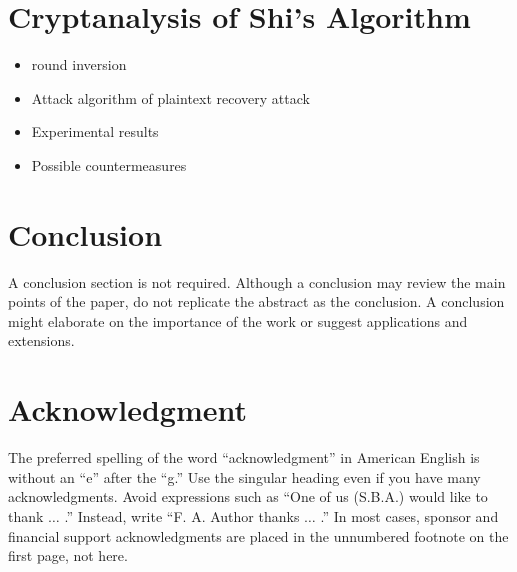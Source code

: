 \documentclass{ieeeaccess}
\begin{document}
\section{Cryptanalysis of Shi's Algorithm}





\begin{itemize}
\item round inversion
\item Attack algorithm of plaintext recovery attack
\item Experimental results
\item Possible countermeasures
\end{itemize}


\section{Conclusion}
A conclusion section is not required. Although a conclusion may review the 
main points of the paper, do not replicate the abstract as the conclusion. A 
conclusion might elaborate on the importance of the work or suggest 
applications and extensions. 

\section*{Acknowledgment}

The preferred spelling of the word ``acknowledgment'' in American English is 
without an ``e'' after the ``g.'' Use the singular heading even if you have 
many acknowledgments. Avoid expressions such as ``One of us (S.B.A.) would 
like to thank $\ldots$ .'' Instead, write ``F. A. Author thanks $\ldots$ .'' In most 
cases, sponsor and financial support acknowledgments are placed in the 
unnumbered footnote on the first page, not here.
\end{document}
